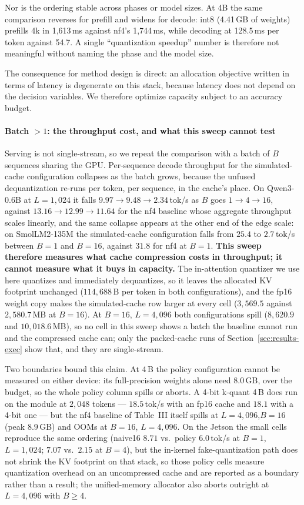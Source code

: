 \documentclass[10pt,journal]{IEEEtran}
\begin{document}
Nor is the ordering stable across phases or model sizes. At 4B the same
comparison reverses for prefill and widens for decode: int8 (4.41\,GB of
weights) prefills 4k in 1{,}613\,ms against nf4's 1{,}744\,ms, while decoding at
128.5\,ms per token against 54.7. A single ``quantization speedup'' number is
therefore not meaningful without naming the phase and the model size.

The consequence for method design is direct: an allocation objective written in
terms of latency is degenerate on this stack, because latency does not depend on
the decision variables. We therefore optimize capacity subject to an accuracy
budget.

\paragraph*{Batch \(>1\): the throughput cost, and what this sweep cannot test}
Serving is not single-stream, so we repeat the comparison with a batch of $B$
sequences sharing the GPU. Per-sequence decode throughput for the
simulated-cache configuration collapses as the batch grows, because the unfused
dequantization re-runs per token, per sequence, in the cache's place. On
Qwen3-0.6B at $L{=}1{,}024$ it falls $9.97 \to 9.48 \to 2.34$\,tok/s as $B$ goes
$1 \to 4 \to 16$, against $13.16 \to 12.99 \to 11.64$ for the nf4 baseline whose
aggregate throughput scales linearly, and the same collapse appears at the other
end of the edge scale: on SmolLM2-135M the simulated-cache configuration falls
from $25.4$ to $2.7$\,tok/s between $B{=}1$ and $B{=}16$, against $31.8$ for nf4
at $B{=}1$. \textbf{This sweep therefore measures what cache compression costs in
throughput; it cannot measure what it buys in capacity.} The in-attention
quantizer we use here quantizes and immediately dequantizes, so it leaves the
allocated KV footprint unchanged ($114{,}688$\,B per token in both
configurations), and the fp16 weight copy makes the simulated-cache row larger at
every cell ($3{,}569.5$ against $2{,}580.7$\,MB at $B{=}16$). At $B{=}16$,
$L{=}4{,}096$ both configurations spill ($8{,}620.9$ and $10{,}018.6$\,MB), so no
cell in this sweep shows a batch the baseline cannot run and the compressed cache
can; only the packed-cache runs of Section~\ref{sec:results-exec} show that, and
they are single-stream.

Two boundaries bound this claim. At 4\,B the policy configuration cannot be
measured on either device: its full-precision weights alone need 8.0\,GB, over
the budget, so the whole policy column spills or aborts. A 4-bit k-quant 4\,B
does run on the module at $2{,}048$ tokens --- $18.5$\,tok/s with an fp16
cache and $18.1$ with a 4-bit one --- but the nf4 baseline of Table~III
itself spills at $L{=}4{,}096$,$B{=}16$ (peak $8.9$\,GB) and OOMs at $B{=}16$,
$L{=}4{,}096$. On the Jetson the small cells reproduce the same ordering
(naive16 $8.71$ vs.~policy $6.0$\,tok/s at $B{=}1$,$L{=}1{,}024$; $7.07$ vs.~$2.15$
at $B{=}4$), but the in-kernel fake-quantization path does not shrink the KV
footprint on that stack, so those policy cells measure quantization overhead on
an uncompressed cache and are reported as a boundary rather than a result; the
unified-memory allocator also aborts outright at $L{=}4{,}096$ with $B{\ge}4$.
\end{document}
